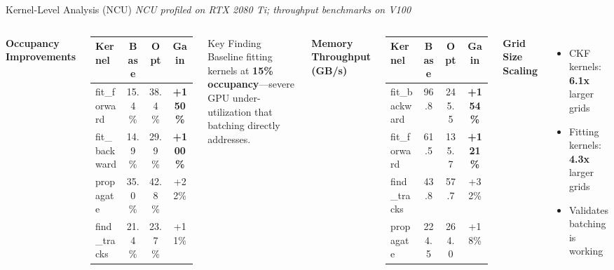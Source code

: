 \documentclass[aspectratio=169, table]{beamer}
\begin{document}
\begin{frame}{Kernel-Level Analysis (NCU)}
{\small \textit{NCU profiled on RTX 2080 Ti; throughput benchmarks on V100}}
\vspace{0.2em}
\begin{columns}
\textbf{Occupancy Improvements}
\begin{table}
    \scriptsize
    \begin{tabular}{lccc}
        \toprule
        \textbf{Kernel} & \textbf{Base} & \textbf{Opt} & \textbf{Gain} \\
        \midrule
        fit\_forward & 15.4\% & 38.4\% & \textbf{+150\%} \\
        fit\_backward & 14.9\% & 29.9\% & \textbf{+100\%} \\
        propagate & 35.0\% & 42.8\% & +22\% \\
        find\_tracks & 21.4\% & 23.7\% & +11\% \\
        \bottomrule
    \end{tabular}
\end{table}

\vspace{0.3em}
\begin{alertblock}{Key Finding}
    Baseline fitting kernels at \textbf{15\% occupancy}---severe GPU under-utilization that batching directly addresses.
\end{alertblock}

\textbf{Memory Throughput (GB/s)}
\begin{table}
    \scriptsize
    \begin{tabular}{lccc}
        \toprule
        \textbf{Kernel} & \textbf{Base} & \textbf{Opt} & \textbf{Gain} \\
        \midrule
        fit\_backward & 96.8 & 245.5 & \textbf{+154\%} \\
        fit\_forward & 61.5 & 135.7 & \textbf{+121\%} \\
        find\_tracks & 43.8 & 57.7 & +32\% \\
        propagate & 224.5 & 264.0 & +18\% \\
        \bottomrule
    \end{tabular}
\end{table}

\vspace{0.3em}
\textbf{Grid Size Scaling}
\begin{itemize}
    \item CKF kernels: \textbf{6.1x} larger grids
    \item Fitting kernels: \textbf{4.3x} larger grids
    \item Validates batching is working
\end{itemize}
\end{columns}
\end{frame}
\end{document}
